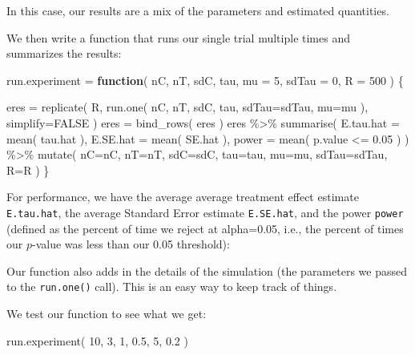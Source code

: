 \documentclass[
]{book}
\newenvironment{Shaded}{\begin{snugshade}}{\end{snugshade}}
\newcommand{\AttributeTok}[1]{\textcolor[rgb]{0.77,0.63,0.00}{#1}}
\newcommand{\ConstantTok}[1]{\textcolor[rgb]{0.00,0.00,0.00}{#1}}
\newcommand{\ControlFlowTok}[1]{\textcolor[rgb]{0.13,0.29,0.53}{\textbf{#1}}}
\newcommand{\DecValTok}[1]{\textcolor[rgb]{0.00,0.00,0.81}{#1}}
\newcommand{\FloatTok}[1]{\textcolor[rgb]{0.00,0.00,0.81}{#1}}
\newcommand{\FunctionTok}[1]{\textcolor[rgb]{0.00,0.00,0.00}{#1}}
\newcommand{\NormalTok}[1]{#1}
\newcommand{\OtherTok}[1]{\textcolor[rgb]{0.56,0.35,0.01}{#1}}
\newcommand{\SpecialCharTok}[1]{\textcolor[rgb]{0.00,0.00,0.00}{#1}}
\begin{document}
In this case, our results are a mix of the parameters and estimated quantities.

We then write a function that runs our single trial multiple times and
summarizes the results:

\begin{Shaded}
\begin{Highlighting}[]
\NormalTok{run.experiment }\OtherTok{=} \ControlFlowTok{function}\NormalTok{( nC, nT, sdC, tau, }\AttributeTok{mu =} \DecValTok{5}\NormalTok{, }\AttributeTok{sdTau =} \DecValTok{0}\NormalTok{, }\AttributeTok{R =} \DecValTok{500}\NormalTok{ ) \{}

\NormalTok{  eres }\OtherTok{=} \FunctionTok{replicate}\NormalTok{( R, }\FunctionTok{run.one}\NormalTok{( nC, nT, sdC, tau, }\AttributeTok{sdTau=}\NormalTok{sdTau, }\AttributeTok{mu=}\NormalTok{mu ), }
                    \AttributeTok{simplify=}\ConstantTok{FALSE}\NormalTok{ )}
\NormalTok{  eres }\OtherTok{=} \FunctionTok{bind\_rows}\NormalTok{( eres )}
\NormalTok{  eres }\SpecialCharTok{\%\textgreater{}\%} \FunctionTok{summarise}\NormalTok{( }\AttributeTok{E.tau.hat =} \FunctionTok{mean}\NormalTok{( tau.hat ),}
                      \AttributeTok{E.SE.hat =} \FunctionTok{mean}\NormalTok{( SE.hat ),}
                      \AttributeTok{power =} \FunctionTok{mean}\NormalTok{( p.value }\SpecialCharTok{\textless{}=} \FloatTok{0.05}\NormalTok{ ) ) }\SpecialCharTok{\%\textgreater{}\%}
    \FunctionTok{mutate}\NormalTok{( }\AttributeTok{nC=}\NormalTok{nC, }\AttributeTok{nT=}\NormalTok{nT, }\AttributeTok{sdC=}\NormalTok{sdC, }\AttributeTok{tau=}\NormalTok{tau, }\AttributeTok{mu=}\NormalTok{mu, }\AttributeTok{sdTau=}\NormalTok{sdTau, }\AttributeTok{R=}\NormalTok{R )}
\NormalTok{\}}
\end{Highlighting}
\end{Shaded}

For performance, we have the average average treatment effect estimate \texttt{E.tau.hat},
the average Standard Error estimate \texttt{E.SE.hat},
and the power \texttt{power} (defined as the percent of time we reject at
alpha=0.05, i.e., the percent of times our \(p\)-value was less than our 0.05
threshold):

Our function also adds in the details of the simulation (the parameters we passed
to the \texttt{run.one()} call). This is an easy way to keep track of things.

We test our function to see what we get:

\begin{Shaded}
\begin{Highlighting}[]
\FunctionTok{run.experiment}\NormalTok{( }\DecValTok{10}\NormalTok{, }\DecValTok{3}\NormalTok{, }\DecValTok{1}\NormalTok{, }\FloatTok{0.5}\NormalTok{, }\DecValTok{5}\NormalTok{, }\FloatTok{0.2}\NormalTok{ )}
\end{Highlighting}
\end{Shaded}
\end{document}
